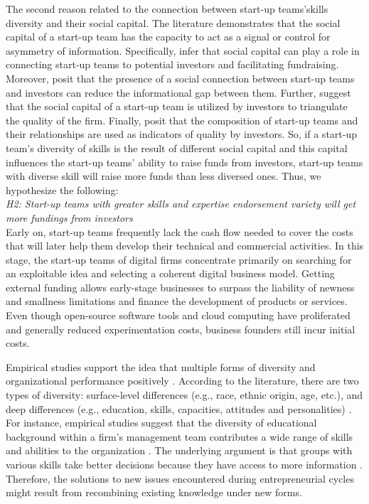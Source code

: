 \documentclass[12pt]{article}
\begin{document}
The second reason related to the connection between start-up teams'skills diversity and their social capital. The literature demonstrates that the social capital of a start-up team has the capacity to act as a signal or control for asymmetry of information. Specifically, \citet{shane2002network} infer that social capital can play a role in connecting start-up teams to potential investors and facilitating fundraising. Moreover, \citet{huang2017resources, shane2002organizational} posit that the presence of a social connection between start-up teams and investors can reduce the informational gap between them. Further, \citet{hoenig2015quality, shane2002organizational} suggest that the social capital of a start-up team is utilized by investors to triangulate the quality of the firm. Finally, \citet{plummer2016better, semrau2014exactly} posit that the composition of start-up teams and their relationships are used as indicators of quality by investors. So, if a start-up team's diversity of skills is the result of different social capital and this capital influences the start-up teams' ability to raise funds from investors, start-up teams with diverse skill will raise more funds than less diversed ones. Thus, we hypothesize the following: \\

\noindent \textit{H2: Start-up teams with greater skills and expertise endorsement variety will get more fundings from investors} \\

Early on, start-up teams frequently lack the cash flow needed to cover the costs that will later help them develop their technical and commercial activities. In this stage, the start-up teams of digital firms concentrate primarily on searching for an exploitable idea and selecting a coherent digital business model. Getting external funding allows early-stage businesses to surpass the liability of newness and smallness limitations and finance the development of products or services. Even though open-source software tools and cloud computing have proliferated and generally reduced experimentation costs, business founders still incur initial costs.

Empirical studies support the idea that multiple forms of diversity and organizational performance positively \citep{zhou2015entrepreneurial}. According to the literature, there are two types of diversity: surface-level differences (e.g., race, ethnic origin, age, etc.), and deep differences (e.g., education, skills, capacities, attitudes and personalities) \citep{bell2007deep}. For instance, empirical studies suggest that the diversity of educational background within a firm's management team contributes a wide range of skills and abilities to the organization \citep{beckman2007early, zarutskie2010role}. The underlying argument is that groups with various skills take better decisions because they have access to more information \citep{hong2001problem}. Therefore, the solutions to new issues encountered during entrepreneurial cycles might result from recombining existing knowledge under new forms.
\end{document}

